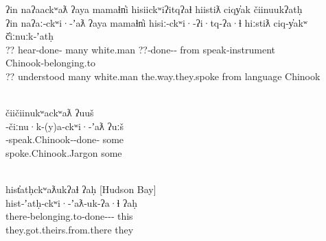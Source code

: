 \begin{exe}
  \glllll ʔin naʔaackʷaƛ ʔaya mamaɬn̓i hisiickʷiʔitqʔaɬ hiistiƛ ciqy̓ak čiinuukʔatḥ\\
          ʔin           naʔaː‑ckʷi·‑ʼaƛ      ʔaya           mamaɬn̓i           hisiː‑ckʷi·‑ʔi·tq‑ʔa·ɬ     hiːstiƛ           ciq‑y̓akʷ         č̓iːnuːk‑ʼatḥ\\
          ??            hear‑done‑   many           white.man         ??‑done‑‑ from              speak‑instrument Chinook‑belonging.to\\
          ??            understood           many           white.man         the.way.they.spoke         from              language         Chinook\\
          { }                                        { }                                          \\
          \vfix

  \glllll čiičiinukʷackʷaƛ                      ʔuuš\\
          ‑čiːnu·k‑(y)a‑ckʷi·‑ʼaƛ                 ʔuːš\\
          ‑speak.Chinook‑‑done‑ some\\
          spoke.Chinook.Jargon                            some\\
                                                 \\
          \vfix

  \glllll hist̓atḥckʷaƛukʔaɬ                        ʔaḥ [Hudson Bay]\\
          hist‑ʼatḥ‑ckʷi·‑ʼaƛ‑uk‑ʔa·ɬ                        ʔaḥ           ~\\
          there‑belonging.to‑done‑‑‑ this          ~\\
          they.got.theirs.from.there                         they          ~\\
                                                          { }\\
          \vfix


\end{exe}

